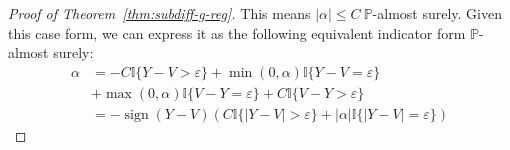 \documentclass{article}
\begin{document}
\begin{proof}[Proof of Theorem~\ref{thm:subdiff-g-reg}]
This means $|\alpha| \leq C \ \mathbb{P}$-almost surely. Given this case form, we can express it as the following equivalent indicator form $\mathbb{P}$-almost surely:
\begin{align}
    \alpha & = -C \mathbb{I}\{Y-V>\varepsilon\} + \min(0,\alpha) \mathbb{I}\{Y-V=\varepsilon\} \\
    & + \max(0,\alpha) \mathbb{I}\{V-Y = \varepsilon\} + C\mathbb{I}\{V-Y>\varepsilon\}\\
    & = -\operatorname{sign}(Y-V)(C\mathbb{I}\{|Y-V| > \varepsilon\} + |\alpha| \mathbb{I}\{|Y-V| = \varepsilon\})
\end{align}

\end{proof}



\end{document}
